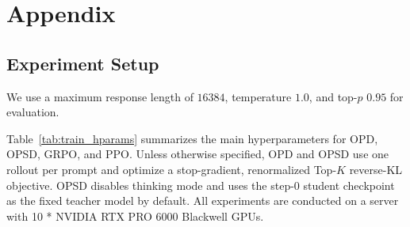 \appendix

\section{Appendix}


\subsection{Experiment Setup}
\label{app:opd_hparams}


We use a maximum response length of $16384$, temperature $1.0$, and top-$p$ $0.95$ for evaluation.

Table~\ref{tab:train_hparams} summarizes the main hyperparameters for OPD, OPSD, GRPO, and PPO. Unless otherwise specified, OPD and OPSD use one rollout per prompt and optimize a stop-gradient, renormalized Top-$K$ reverse-KL objective. OPSD disables thinking mode and uses the step-0 student checkpoint as the fixed teacher model by default. All experiments are conducted on a server with 10 * NVIDIA RTX PRO 6000 Blackwell GPUs.

